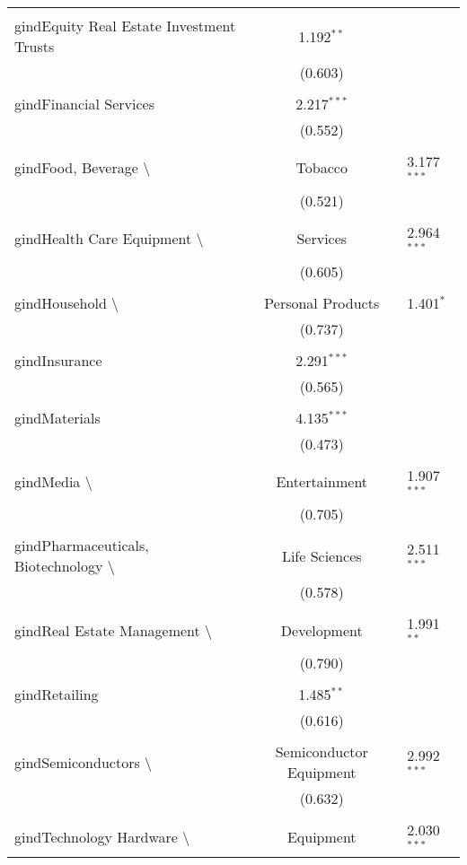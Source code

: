 \begin{table}[!htbp]
\begin{tabular}{@{\extracolsep{5pt}}lc}
  & \\ 
 gindEquity Real Estate Investment Trusts & 1.192$^{**}$ \\ 
  & (0.603) \\ 
  & \\ 
 gindFinancial Services & 2.217$^{***}$ \\ 
  & (0.552) \\ 
  & \\ 
 gindFood, Beverage \textbackslash & Tobacco & 3.177$^{***}$ \\ 
  & (0.521) \\ 
  & \\ 
 gindHealth Care Equipment \textbackslash & Services & 2.964$^{***}$ \\ 
  & (0.605) \\ 
  & \\ 
 gindHousehold \textbackslash & Personal Products & 1.401$^{*}$ \\ 
  & (0.737) \\ 
  & \\ 
 gindInsurance & 2.291$^{***}$ \\ 
  & (0.565) \\ 
  & \\ 
 gindMaterials & 4.135$^{***}$ \\ 
  & (0.473) \\ 
  & \\ 
 gindMedia \textbackslash & Entertainment & 1.907$^{***}$ \\ 
  & (0.705) \\ 
  & \\ 
 gindPharmaceuticals, Biotechnology \textbackslash & Life Sciences & 2.511$^{***}$ \\ 
  & (0.578) \\ 
  & \\ 
 gindReal Estate Management \textbackslash & Development & 1.991$^{**}$ \\ 
  & (0.790) \\ 
  & \\ 
 gindRetailing & 1.485$^{**}$ \\ 
  & (0.616) \\ 
  & \\ 
 gindSemiconductors \textbackslash & Semiconductor Equipment & 2.992$^{***}$ \\ 
  & (0.632) \\ 
  & \\ 
 gindTechnology Hardware \textbackslash & Equipment & 2.030$^{***}$ \\ 

\end{tabular}
\end{table}
